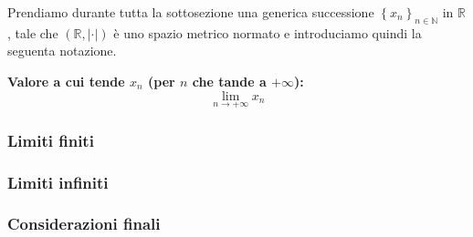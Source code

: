 Prendiamo durante tutta la sottosezione una generica successione
$\left\{x_n\right\}_{n\in\mathbb{N}}$ in $\mathbb{R}$, tale che
$\left(\mathbb{R}, \left|\cdot\right|\right)$ è uno spazio metrico normato e
introduciamo quindi la seguenta notazione.

\textbf{Valore a cui tende $x_n$ (per $n$ che tande a $+\infty$):}
\[
    \underset{n\rightarrow+\infty}{\lim} x_n
\]

\subsubsection{Limiti finiti}



\subsubsection{Limiti infiniti}



\subsubsection{Considerazioni finali}

